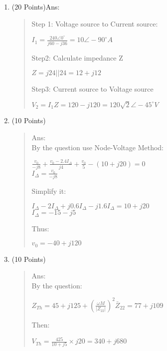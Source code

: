 \documentclass[12pt,a4paper]{article}
\begin{document}
\begin{enumerate}
		\item (20 Points)Ans:
		\begin{quote}
		Step 1: Voltage source to Current source:
		\begin{center}
			$I_1 = \frac{240\angle 0^\circ}{j60-j36} = 10\angle -90^\circ A$
		\end{center}
		Step2: Calculate impedance Z
		\begin{center}
			$Z=j24||24=12+j12$
		\end{center}
		Step3: Current source to Voltage source
		\begin{center}
			$V_2=I_1Z=120-j120=120\sqrt{2}\angle -45^\circ V$
		\end{center}
		\end{quote}
		\clearpage
		
		\item (10 Points)
		\begin{quote}
			Ans:\\
			By the question use Node-Voltage Method:
			\begin{center}
				$\frac{v_0}{-j8}+\frac{v_0-2.4I_\Delta}{j4}+\frac{v_0}{5}-(10+j20)=0$\\
				$I_\Delta = \frac{v_0}{-j8}$
			\end{center}
			Simplify it:
			\begin{center}
				$I_\Delta-2I_\Delta+j0.6I_\Delta-j1.6I_\Delta=10+j20$\\
				$I_\Delta=-15-j5$
			\end{center}
			Thus:
			\begin{center}
				$v_0=-40+j120$
			\end{center}
		\end{quote}
		
		\clearpage
		\item (10 Points)
		\begin{quote}
			Ans:\\
			By the question:
			\begin{center}
				$Z_{Th}=45+j125+(\frac{\omega M}{|Z_{22}|})^2\bar Z_{22}=77+j109$
			\end{center}
			Then:
			\begin{center}
				$V_{Th} = \frac{425}{10+j5}\times j20=340+j680$
			\end{center}
		\end{quote}
		\clearpage
		

\end{enumerate}
\end{document}
